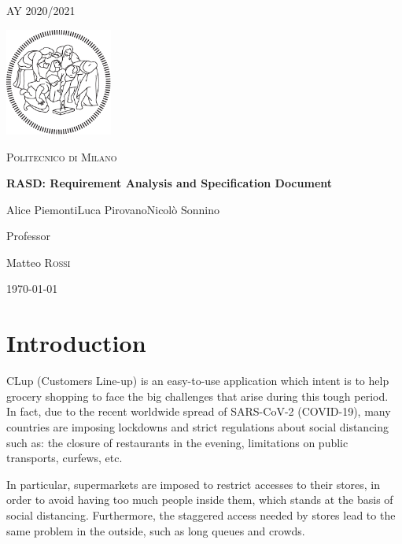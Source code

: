 \documentclass[12pt]{article}
\begin{document}
\begin{titlepage}
    \centering
    {\scshape\large AY 2020/2021 \par}
    \vfill
    \includegraphics[width=100pt]{assets/logo-polimi-new}\par\vspace{1cm}
    {\scshape\LARGE Politecnico di Milano \par}
    \vspace{1.5cm}
    {\huge\bfseries RASD\@: Requirement Analysis
        and Specification Document \par}
    \vspace{2cm}
    {\Large {Alice Piemonti\quad Luca Pirovano\quad Nicolò Sonnino}\par}
    \vfill
    {\large Professor\par
        Matteo \textsc{Rossi}}
    \vfill
    {\large \today \par}
\end{titlepage}
\thispagestyle{plain}
\mbox{}
\newpage
{}
\tableofcontents
\newpage
{}
\section{Introduction}
CLup (Customers Line-up) is an easy-to-use application which intent is to help grocery shopping to face the big challenges that arise during this tough period.\\

In fact, due to the recent worldwide spread of SARS-CoV-2 (COVID-19), many countries are imposing lockdowns and strict regulations about social distancing such as: the closure of restaurants in the evening, limitations on public transports, curfews, etc.

In particular, supermarkets are imposed to restrict accesses to their stores, in order to avoid having too much people inside them, which stands at the basis of social distancing. Furthermore, the staggered access needed by stores lead to the same problem in the outside, such as long queues and crowds.
\end{document}
